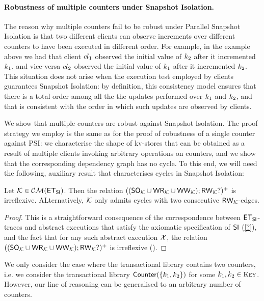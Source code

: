\paragraph{Robustness of multiple counters under Snapshot Isolation.}
The reason why multiple counters fail to be robust under Parallel Snapshot Isolation is 
that two different clients can observe increments over different counters to have been 
executed in different order. For example, in the example above we had that client ${cl}_1$ 
observed the initial value of $k_2$ after it incremented $k_1$, and vice-versa ${cl}_2$ 
observed the initial value of $k_1$ after it incremented $k_2$. This situation does not 
arise when the execution test employed by clients guarantees Snapshot Isolation: 
by definition, this consistency model ensures that there is a total order among all the the updates 
performed over $k_1$ and $k_2$, and that is consistent with the order in which such updates 
are observed by clients. 

We show that multiple counters are robust against Snapshot Isolation. 
The proof strategy we employ is the same as for the proof of robustness of a single 
counter against PSI: we characterise the shape of kv-stores that can be obtained 
as a result of multiple clients invoking arbitrary operations on counters, and we show 
that the corresponding dependency graph has no cycle. 
To this end, we will need the following, auxiliary result that characterises cycles in 
Snapshot Isolation: 
\begin{proposition}
\label{prop:si_cycles}
Let $\mathcal{K} \in \mathcal{CM}(\mathsf{ET}_{\mathsf{SI}})$. Then the relation $((\mathsf{SO}_{\mathcal{K}} \cup \mathsf{WR}_{\mathcal{K}} \cup \mathsf{WW}_{\mathcal{K}}) ; \mathsf{RW}_{\mathcal{K}}?)^{+}$ is 
irreflexive. ALternatively, $\mathcal{K}$ only admits cycles with two consecutive $\mathsf{RW}_{\mathcal{K}}$-edges.
\end{proposition}

\begin{proof}
This is a straightforward consequence of the correspondence between $\mathsf{ET}_{\mathsf{SI}}$-traces and 
abstract executions that satisfy the axiomatic specification of $\mathsf{SI}$ (\cref{?}), and the fact that for any 
such abstract execution $\mathcal{X}$, the relation $((\mathsf{SO}_{\mathcal{K}} \cup \mathsf{WR}_{\mathcal{K}} \cup \mathsf{WW}_{\mathcal{K}}); \mathsf{RW}_{\mathcal{K}}?)^{+}$ 
is irreflexive (\cite{feketeSI,SIanalysis,laws}).
\end{proof}

We only consider 
the case where the transactional library contains two counters, i.e. we 
consider the transactional library $\mathsf{Counter}(\{k_1, k_2\})$ for some $\ke_1, \ke_2 \in \Keys$. 
However, our line of reasoning can be generalised to an arbitrary number of counters. 

